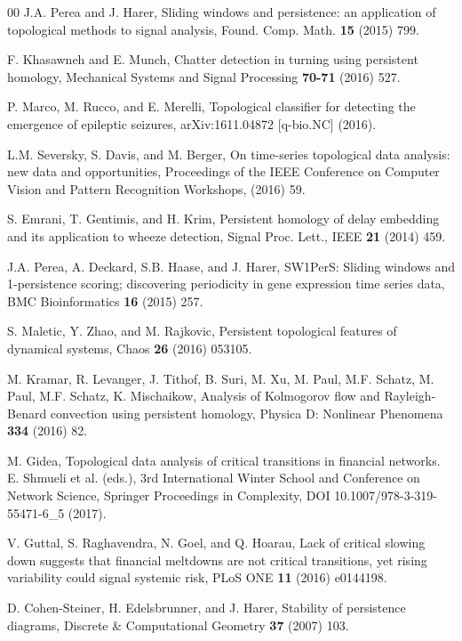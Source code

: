 \documentclass[preprint,12pt]{elsarticle}
\theoremstyle{definition}
\theoremstyle{remark}
\numberwithin{equation}{section}
\theoremstyle{definition}
\begin{document}
\begin{thebibliography}{00}
  J.A. Perea and J. Harer, Sliding windows and persistence: an application of topological methods to signal analysis, Found. Comp. Math.  \textbf{15} (2015) 799.

 F. Khasawneh  and  E. Munch, Chatter detection in turning using persistent homology, Mechanical Systems and Signal Processing  \textbf{70-71} (2016) 527.


  P. Marco, M. Rucco, and E. Merelli, Topological classifier for detecting the emergence of epileptic seizures, arXiv:1611.04872 [q-bio.NC] (2016).

  L.M. Seversky, S. Davis, and  M. Berger, On time-series topological data analysis: new data and opportunities, Proceedings of the IEEE Conference on Computer Vision and Pattern Recognition Workshops, (2016) 59.

  S. Emrani, T. Gentimis, and H. Krim, Persistent homology of delay embedding and its application to wheeze detection, Signal Proc. Lett., IEEE  \textbf{21} (2014) 459.



  J.A. Perea, A. Deckard, S.B. Haase, and J. Harer, SW1PerS: Sliding windows and 1-persistence scoring; discovering periodicity in gene expression time series data, BMC Bioinformatics  \textbf{16} (2015) 257.

S. Maletic, Y. Zhao, and M. Rajkovic, Persistent topological features of dynamical systems, Chaos \textbf{26} (2016) 053105.

  M. Kramar, R. Levanger, J. Tithof, B. Suri, M. Xu, M. Paul, M.F. Schatz, M. Paul, M.F.
Schatz, K. Mischaikow, Analysis of Kolmogorov flow and Rayleigh-Benard convection using persistent homology, Physica D: Nonlinear Phenomena \textbf{334} (2016) 82.

 M. Gidea, Topological data analysis of critical transitions in financial
networks. E. Shmueli et al. (eds.), 3rd International Winter School and Conference on Network
Science, Springer Proceedings in Complexity, DOI 10.1007/978-3-319-55471-6\_5 (2017).


    V. Guttal, S. Raghavendra, N. Goel, and Q. Hoarau, Lack of critical slowing down suggests that financial meltdowns are not critical transitions, yet rising variability could signal systemic risk, PLoS ONE  \textbf{11} (2016) e0144198.

 D. Cohen-Steiner, H. Edelsbrunner, and J. Harer, Stability of persistence diagrams,
Discrete \& Computational Geometry \textbf{37}  (2007) 103.



\end{thebibliography}
\end{document}

